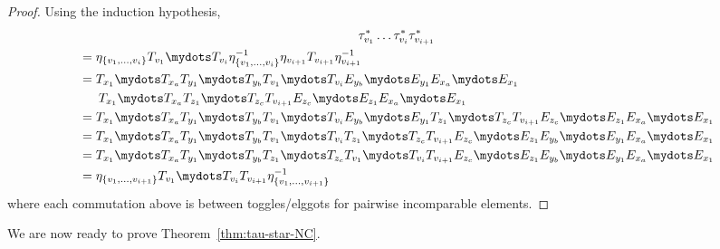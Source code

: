 \begin{proof}
Using the induction hypothesis,
\begin{multline*}
 \tau_{v_1}^*\dots \tau_{v_i}^* \tau_{v_{i+1}}^* \\
\begin{aligned}
&=
\eta_{\{v_1,\dots,v_i\}} T_{v_1}\mydots T_{v_i} \eta_{\{v_1,\dots,v_i\}}^{-1}\eta_{v_{i+1}} T_{v_{i+1}} \eta_{v_{i+1}}^{-1}\\
&=
T_{x_1}\mydots T_{x_a} T_{y_1} \mydots T_{y_b} T_{v_1} \mydots T_{v_i} E_{y_b} \mydots E_{y_1} E_{x_a}\mydots E_{x_1}\\&\phantom{==} T_{x_1}\mydots T_{x_a} T_{z_1} \mydots T_{z_c} T_{v_{i+1}} E_{z_c} \mydots E_{z_1} E_{x_a}\mydots E_{x_1}\\
&=
T_{x_1}\mydots T_{x_a} T_{y_1} \mydots T_{y_b} T_{v_1} \mydots T_{v_i} E_{y_b} \mydots E_{y_1} T_{z_1} \mydots T_{z_c} T_{v_{i+1}} E_{z_c} \mydots E_{z_1} E_{x_a}\mydots E_{x_1}\\
&=
T_{x_1}\mydots T_{x_a} T_{y_1} \mydots T_{y_b} T_{v_1} \mydots T_{v_i} T_{z_1} \mydots T_{z_c} T_{v_{i+1}} E_{z_c} \mydots E_{z_1} E_{y_b} \mydots E_{y_1} E_{x_a}\mydots E_{x_1}\\
&=
T_{x_1}\mydots T_{x_a} T_{y_1} \mydots T_{y_b} T_{z_1} \mydots T_{z_c} T_{v_1} \mydots T_{v_i} T_{v_{i+1}} E_{z_c} \mydots E_{z_1} E_{y_b} \mydots E_{y_1} E_{x_a}\mydots E_{x_1}\\
&=
\eta_{\{v_1,\dots,v_{i+1}\}} T_{v_1}\mydots T_{v_i}
T_{v_{i+1}}\eta_{\{v_1,\dots,v_{i+1}\}}^{-1}
\end{aligned}
\end{multline*}
where each commutation above is between toggles/elggots for pairwise incomparable elements.
\end{proof}

We are now ready to prove Theorem~\ref{thm:tau-star-NC}.

